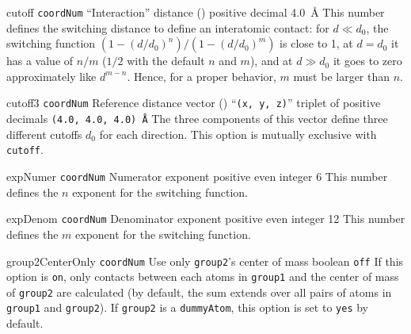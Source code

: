 \begin{cvcoptions}

\item %

\item %

\item %
  \keydef
    {cutoff}{%
    \texttt{coordNum}}{%
    ``Interaction'' distance (\lengthunit)}{%
    positive decimal}{%
    4.0~\AA{}}{%
    This number defines the switching distance to define an
    interatomic contact: for $d \ll d_0$, the switching function
    $(1-(d/d_0)^{n})/(1-(d/d_0)^{m})$ is close to 1, at $d = d_0$ it
    has a value of $n/m$ ($1/2$ with the default $n$ and $m$), and at
    $d \gg d_0$ it goes to zero approximately like $d^{m-n}$.  Hence,
    for a proper behavior, $m$ must be larger than $n$.}

\item %
  \keydef
    {cutoff3}{%
    \texttt{coordNum}}{%
    Reference distance vector (\lengthunit)}{%
    ``\texttt{(x, y, z)}'' triplet of positive decimals}{%
    \texttt{(4.0, 4.0, 4.0)~\AA}}{%
    The three components of this vector define three different cutoffs
    $d_{0}$ for each direction.  This option is mutually exclusive with
    \texttt{cutoff}.}

\item %
  \keydef
    {expNumer}{%
    \texttt{coordNum}}{%
    Numerator exponent}{%
    positive even integer}{%
    6}{%
    This number defines the $n$ exponent for the switching function.}

\item %
  \keydef
    {expDenom}{%
    \texttt{coordNum}}{%
    Denominator exponent}{%
    positive even integer}{%
    12}{%
    This number defines the $m$ exponent for the switching function.}

\item %
  \keydef
    {group2CenterOnly}{%
    \texttt{coordNum}}{%
    Use only \texttt{group2}'s center of
    mass}{%
    boolean}{%
    \texttt{off}}{%
    If this option is \texttt{on}, only contacts between each atoms in \texttt{group1} and the center of mass of     \texttt{group2} are calculated (by default, the sum extends over all pairs of atoms in \texttt{group1} and \texttt{group2}).
If \texttt{group2} is a \texttt{dummyAtom}, this option is set to \texttt{yes} by default.
}


\end{cvcoptions}
